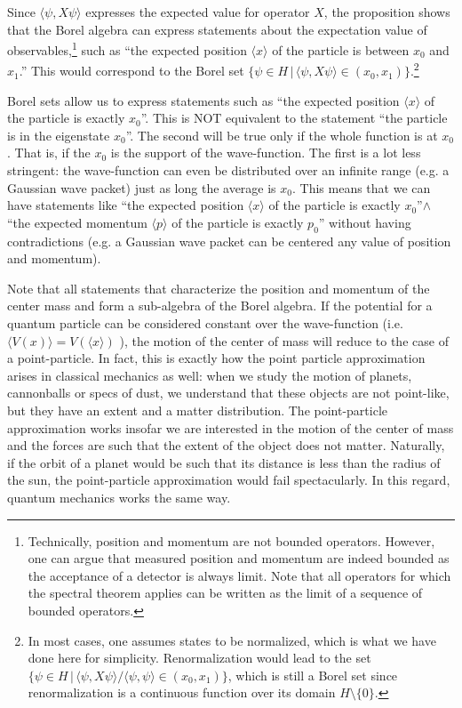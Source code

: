 \documentclass[10pt,twocolumn, nofootinbib]{revtex4-1}
\begin{document}
Since $\langle \psi , X \psi \rangle$ expresses the expected value for operator $X$, the proposition shows that the Borel algebra can express statements about the expectation value of observables,\footnote{Technically, position and momentum are not bounded operators. However, one can argue that measured position and momentum are indeed bounded as the acceptance of a detector is always limit. Note that all operators for which the spectral theorem applies can be written as the limit of a sequence of bounded operators.} such as ``the expected position $\langle x \rangle$ of the particle is between $x_0$ and $x_1$.'' This would correspond to the Borel set $\{ \psi \in H \, | \, \langle \psi , X \psi \rangle \in (x_0, x_1) \}$.\footnote{In most cases, one assumes states to be normalized, which is what we have done here for simplicity. Renormalization would lead to the set $\{ \psi \in H \, | \, \langle \psi , X \psi \rangle / \langle \psi , \psi \rangle \in (x_0, x_1) \}$, which is still a Borel set since renormalization is a continuous function over its domain $H \setminus \{ 0 \}$.}

Borel sets allow us to express statements such as ``the expected position $\langle x \rangle$ of the particle is exactly $x_0$''. This is NOT equivalent to the statement ``the particle is in the eigenstate $x_0$''. The second will be true only if the whole function is at $x_0$. That is, if the $x_0$ is the support of the wave-function. The first is a lot less stringent: the wave-function can even be distributed over an infinite range (e.g. a Gaussian wave packet) just as long the average is $x_0$. This means that we can have statements like ``the expected position $\langle x \rangle$ of the particle is exactly $x_0$''$\wedge$ ``the expected momentum $\langle p \rangle$ of the particle is exactly $p_0$'' without having contradictions (e.g. a Gaussian wave packet can be centered any value of position and momentum).

Note that all statements that characterize the position and momentum of the center mass and form a sub-algebra of the Borel algebra. If the potential for a quantum particle can be considered constant over the wave-function (i.e. $\langle V(x) \rangle = V(\langle x \rangle)$ ), the motion of the center of mass will reduce to the case of a point-particle. In fact, this is exactly how the point particle approximation arises in classical mechanics as well: when we study the motion of planets, cannonballs or specs of dust, we understand that these objects are not point-like, but they have an extent and a matter distribution. The point-particle approximation works insofar we are interested in the motion of the center of mass and the forces are such that the extent of the object does not matter. Naturally, if the orbit of a planet would be such that its distance is less than the radius of the sun, the point-particle approximation would fail spectacularly. In this regard, quantum mechanics works the same way.
\end{document}
